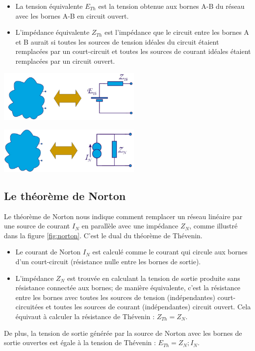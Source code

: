 \begin{itemize}
	\item La tension équivalente $E_{Th}$ est la tension obtenue aux bornes A-B du réseau avec les bornes A-B en circuit ouvert.
	\item L'impédance équivalente $Z_{Th}$ est l'impédance que le circuit entre les bornes A et B aurait si toutes les sources de tension idéales du circuit étaient remplacées par un court-circuit et toutes les sources de courant idéales étaient remplacées par un circuit ouvert.
\end{itemize}

\begin{minipage}{.5\textwidth}
	\centering
	\includegraphics[width=7cm]{figures/ch00/thevenin.jpg}
	\label{fig:thevenin}
\end{minipage}
\begin{minipage}{.5\textwidth}
	\centering
	\includegraphics[width=7cm]{figures/ch00/norton.jpg}
	\label{fig:norton}
\end{minipage}%

\subsection{Le théorème de Norton}
Le théorème de Norton nous indique comment remplacer un réseau linéaire par une source de courant $I_N$ en parallèle avec une impédance $Z_N$, comme illustré dans la figure \ref{fig:norton}. C'est le dual du théorème de Thévenin.
\begin{itemize}
	\item Le courant de Norton $I_N$ est calculé comme le courant qui circule aux bornes d'un court-circuit (résistance nulle entre les bornes de sortie).
	\item L'impédance $Z_N$ est trouvée en calculant la tension de sortie produite sans résistance connectée aux bornes; de manière équivalente, c'est la résistance entre les bornes avec toutes les sources de tension (indépendantes) court-circuitées et toutes les sources de courant (indépendantes) circuit ouvert. Cela équivaut à calculer la résistance de Thévenin : $Z_{Th} = Z_{N}$.
\end{itemize}
De plus, la tension de sortie générée par la source de Norton avec les bornes de sortie ouvertes est égale à la tension de Thévenin : $E_{Th} = Z_{N} ; I_N$.

